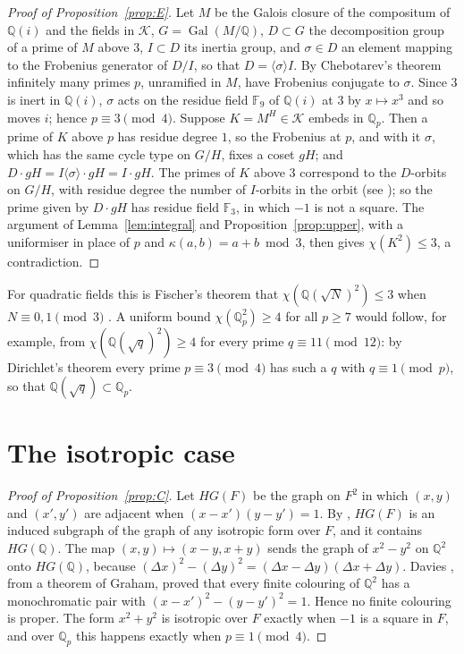 \documentclass[11pt,a4paper]{amsart}
\theoremstyle{remark}
\newcommand{\F}{\mathbb{F}}
\newcommand{\Q}{\mathbb{Q}}
\begin{document}
\begin{proof}[Proof of Proposition~\ref{prop:E}]
Let $M$ be the Galois closure of the compositum of $\Q(i)$ and the fields in $\mathcal K$, $G=\operatorname{Gal}(M/\Q)$,
$D\subset G$ the decomposition group of a prime of $M$ above $3$, $I\subset D$ its inertia group, and $\sigma\in D$
an element mapping to the Frobenius generator of $D/I$, so that $D=\langle\sigma\rangle I$. By Chebotarev's
theorem infinitely many primes $p$, unramified in $M$, have Frobenius conjugate to $\sigma$. Since $3$ is inert in
$\Q(i)$, $\sigma$ acts on the residue field $\F_9$ of $\Q(i)$ at $3$ by $x\mapsto x^3$ and so moves $i$; hence
$p\equiv3\pmod4$. Suppose $K=M^H\in\mathcal K$ embeds in $\Q_p$. Then a prime of $K$ above $p$ has residue degree
$1$, so the Frobenius at $p$, and with it $\sigma$, which has the same cycle type on $G/H$, fixes a coset $gH$;
and $D\cdot gH=I\langle\sigma\rangle\cdot gH=I\cdot gH$. The primes of $K$ above $3$ correspond to the $D$-orbits
on $G/H$, with residue degree the number of $I$-orbits in the orbit (see \cite[Chapter~I, \S9]{Neukirch}); so the
prime given by $D\cdot gH$ has residue field $\F_3$, in which $-1$ is not a square. The argument of
Lemma~\ref{lem:integral} and Proposition~\ref{prop:upper}, with a uniformiser in place of $p$ and
$\kappa(a,b)=a+b\bmod 3$, then gives $\chi(K^2)\le3$, a contradiction.
\end{proof}

For quadratic fields this is Fischer's theorem that $\chi(\Q(\sqrt N)^2)\le3$ when $N\equiv0,1\pmod3$
\cite{Fischer1990}. A uniform bound $\chi(\Q_p^2)\ge4$ for all $p\ge7$ would follow, for example, from
$\chi(\Q(\sqrt q)^2)\ge4$ for every prime $q\equiv11\pmod{12}$: by Dirichlet's theorem every prime
$p\equiv3\pmod4$ has such a $q$ with $q\equiv1\pmod p$, so that $\Q(\sqrt q)\subset\Q_p$.

\section{The isotropic case}

\begin{proof}[Proof of Proposition~\ref{prop:C}]
Let $HG(F)$ be the graph on $F^2$ in which $(x,y)$ and $(x',y')$ are adjacent when $(x-x')(y-y')=1$. By
\cite[Lemma~2.7]{BMK}, $HG(F)$ is an induced subgraph of the graph of any isotropic form over $F$, and it contains
$HG(\Q)$. The map $(x,y)\mapsto(x-y,x+y)$ sends the graph of $x^2-y^2$ on $\Q^2$ onto $HG(\Q)$, because
$(\Delta x)^2-(\Delta y)^2=(\Delta x-\Delta y)(\Delta x+\Delta y)$. Davies \cite[Theorem~3]{Davies}, from a
theorem of Graham, proved that every finite colouring of $\Q^2$ has a monochromatic pair with
$(x-x')^2-(y-y')^2=1$. Hence no finite colouring is proper. The form $x^2+y^2$ is isotropic over $F$ exactly when
$-1$ is a square in $F$, and over $\Q_p$ this happens exactly when $p\equiv1\pmod4$.
\end{proof}
\end{document}
